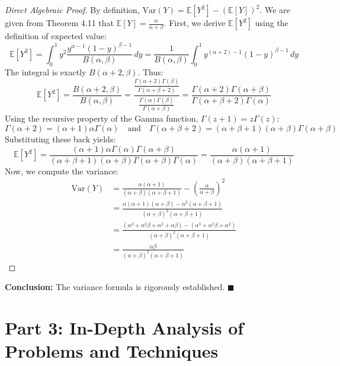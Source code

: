 \documentclass[11pt, a4paper]{article}
\theoremstyle{definition}
\theoremstyle{remark}
\newcommand{\E}{\mathbb{E}}
\begin{document}
\begin{proof}[Direct Algebraic Proof]
By definition, $\text{Var}(Y) = \E[Y^2] - (\E[Y])^2$. We are given from Theorem 4.11 that $\E[Y] = \frac{\alpha}{\alpha+\beta}$.
First, we derive $\E[Y^2]$ using the definition of expected value:
\[
\E[Y^2] = \int_0^1 y^2 \frac{y^{\alpha-1}(1-y)^{\beta-1}}{B(\alpha, \beta)} \, dy = \frac{1}{B(\alpha, \beta)} \int_0^1 y^{(\alpha+2)-1}(1-y)^{\beta-1} \, dy
\]
The integral is exactly $B(\alpha+2, \beta)$. Thus:
\[
\E[Y^2] = \frac{B(\alpha+2, \beta)}{B(\alpha, \beta)} = \frac{\frac{\Gamma(\alpha+2)\Gamma(\beta)}{\Gamma(\alpha+\beta+2)}}{\frac{\Gamma(\alpha)\Gamma(\beta)}{\Gamma(\alpha+\beta)}} = \frac{\Gamma(\alpha+2)\Gamma(\alpha+\beta)}{\Gamma(\alpha+\beta+2)\Gamma(\alpha)}
\]
Using the recursive property of the Gamma function, $\Gamma(z+1) = z\Gamma(z)$:
\[
\Gamma(\alpha+2) = (\alpha+1)\alpha\Gamma(\alpha) \quad \text{and} \quad \Gamma(\alpha+\beta+2) = (\alpha+\beta+1)(\alpha+\beta)\Gamma(\alpha+\beta)
\]
Substituting these back yields:
\[
\E[Y^2] = \frac{(\alpha+1)\alpha\Gamma(\alpha)\Gamma(\alpha+\beta)}{(\alpha+\beta+1)(\alpha+\beta)\Gamma(\alpha+\beta)\Gamma(\alpha)} = \frac{\alpha(\alpha+1)}{(\alpha+\beta)(\alpha+\beta+1)}
\]
Now, we compute the variance:
\begin{align*}
\text{Var}(Y) &= \frac{\alpha(\alpha+1)}{(\alpha+\beta)(\alpha+\beta+1)} - \left( \frac{\alpha}{\alpha+\beta} \right)^2 \\
&= \frac{\alpha(\alpha+1)(\alpha+\beta) - \alpha^2(\alpha+\beta+1)}{(\alpha+\beta)^2(\alpha+\beta+1)} \\
&= \frac{(\alpha^3 + \alpha^2\beta + \alpha^2 + \alpha\beta) - (\alpha^3 + \alpha^2\beta + \alpha^2)}{(\alpha+\beta)^2(\alpha+\beta+1)} \\
&= \frac{\alpha\beta}{(\alpha+\beta)^2(\alpha+\beta+1)}
\end{align*}
\end{proof}
\textbf{Conclusion:} The variance formula is rigorously established. $\blacksquare$

\newpage
\section{Part 3: In-Depth Analysis of Problems and Techniques}
\end{document}
